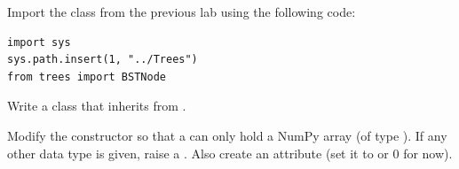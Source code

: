 \begin{problem} %
Import the  class from the previous lab using the following code:
\begin{lstlisting}
import sys
sys.path.insert(1, "../Trees")
from trees import BSTNode
\end{lstlisting}
Write a  class that inherits from .

Modify the constructor so that a  can only hold a NumPy array (of type ).
If any other data type is given, raise a .
Also create an  attribute (set it to  or $0$ for now).

\end{problem}



